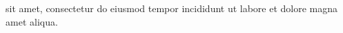\documentclass{article}
\begin{document}
\beginnumbering
\autopar

  sit amet, consectetur  do eiusmod tempor  incididunt ut labore et dolore magna amet aliqua.

\endnumbering
\end{document}
